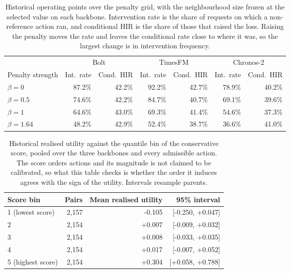 \documentclass{article}
\begin{document}
\begin{table}[tp]
  \caption{Historical operating points over the penalty grid, with the neighbourhood size frozen at the
  selected value on each backbone. Intervention rate is the share of requests on which a
  non-reference action ran, and conditional HIR is the share of those that raised the loss.
  Raising the penalty moves the rate and leaves the conditional rate close to where it was, so
  the largest change is in intervention frequency.}
  \label{tab:app-operating}
  \centering
  \small
  \setlength{\tabcolsep}{4pt}
\begin{tabular*}{\textwidth}{@{\extracolsep{\fill}}lrrrrrr@{}}
    \toprule
     & \multicolumn{2}{c}{Bolt} & \multicolumn{2}{c}{TimesFM} & \multicolumn{2}{c}{Chronos-2} \\
    \cmidrule(lr){2-3}\cmidrule(lr){4-5}\cmidrule(lr){6-7}
    Penalty strength & Int.\ rate & Cond.\ HIR & Int.\ rate & Cond.\ HIR & Int.\ rate & Cond.\ HIR \\
    \midrule
    $\beta = 0$ & 87.2\% & 42.2\% & 92.2\% & 42.7\% & 78.9\% & 40.2\% \\
    $\beta = 0.5$ & 74.6\% & 42.2\% & 84.7\% & 40.7\% & 69.1\% & 39.6\% \\
    $\beta = 1$ & 64.6\% & 43.0\% & 69.3\% & 41.4\% & 54.6\% & 37.3\% \\
    $\beta = 1.64$ & 48.2\% & 42.9\% & 52.4\% & 38.7\% & 36.6\% & 41.0\% \\
    \bottomrule
  \end{tabular*}
\end{table}

\begin{table}[tp]
  \caption{Historical realised utility against the quantile bin of the conservative score, pooled over the
  three backbones and every admissible action. The score orders actions and its magnitude is
  not claimed to be calibrated, so what this table checks is whether the order it induces
  agrees with the sign of the utility. Intervals resample parents.}
  \label{tab:app-scorebins}
  \centering
  \small
  \setlength{\tabcolsep}{4pt}
\begin{tabular*}{\textwidth}{@{\extracolsep{\fill}}lrrr@{}}
    \toprule
    Score bin & Pairs & Mean realised utility & 95\% interval \\
    \midrule
    1 (lowest score) & 2,157 & -0.105 & [-0.250, +0.047] \\
    2 & 2,154 & +0.007 & [-0.009, +0.032] \\
    3 & 2,154 & +0.008 & [-0.033, +0.035] \\
    4 & 2,154 & +0.017 & [-0.007, +0.052] \\
    5 (highest score) & 2,154 & +0.304 & [+0.058, +0.788] \\
    \bottomrule
  \end{tabular*}
\end{table}
\end{document}
